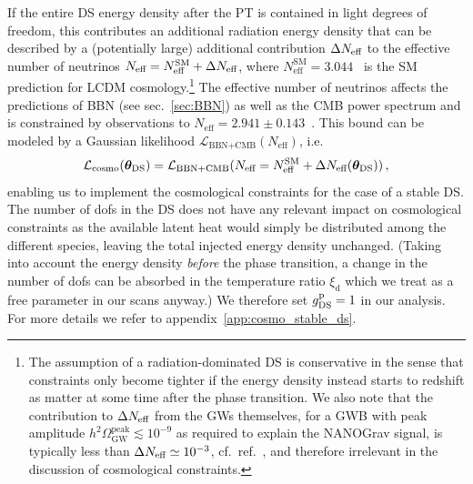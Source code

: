 If the entire \ac{DS} energy density after the \ac{PT} is contained in light degrees of freedom, this contributes an additional radiation energy density that can be described by a (potentially large) additional contribution $\Delta N_\text{eff} $ to the effective number of neutrinos $N_\text{eff} = N_\text{eff}^\text{SM} + \Delta N_\text{eff} $, where $N_\text{eff}^\text{SM} = 3.044$~\cite{Bennett:2020zkv} is the \ac{SM} prediction for \ac{LCDM} cosmology.\footnote{\label{foot_noMD}The assumption of a radiation-dominated \ac{DS} is conservative in the sense that constraints only become tighter if the energy density instead starts to redshift as matter at some time after the phase transition. We also note that the contribution to $\Delta N_\text{eff} $ from the \acp{GW} themselves, for a \ac{GWB} with peak amplitude $h^2 \Omega_\text{GW}^\text{peak} \lesssim 10^{-9}$ as required to explain the \ac{NANOGrav} signal, is typically less than $\Delta N_\text{eff}  \simeq 10^{-3}$, cf.~ref.~\cite{Maggiore:2018sht}, and therefore irrelevant in the discussion of cosmological constraints.}  The effective number of neutrinos affects the predictions of \ac{BBN} (see sec.~\ref{sec:BBN}) as well as the \ac{CMB} power spectrum and is constrained by observations to $N_\text{eff} = 2.941 \pm 0.143$~\cite{Yeh:2022heq}. This bound can be modeled by a Gaussian likelihood $\mathcal{L}_{\text{BBN} + \text{CMB}} (N_\text{eff})$, i.e.
\begin{align}
	\mathcal{L}_\text{cosmo} (\bm{\theta}_{\text{DS}}) = \mathcal{L}_{\text{BBN} + \text{CMB}} (N_\text{eff} = N_\text{eff}^\text{SM} + \Delta N_\text{eff} (\bm{\theta}_{\text{DS}}))\,,
\end{align}
enabling us to implement the cosmological constraints for the case of a stable \ac{DS}. The number of \acp{dof} in the \ac{DS} does not have any relevant impact on cosmological constraints as the available latent heat would simply be distributed among the different species, leaving the total injected energy density unchanged. (Taking into account the energy density \emph{before} the phase transition, a change in the number of \acp{dof} can be absorbed in the temperature ratio $\xi_\mathrm{d}$ which we treat as a free parameter in our scans anyway.) We therefore set $g_{\text{DS}}^{\text{p}}=1$ in our analysis. For more details we refer to appendix~\ref{app:cosmo_stable_ds}.

